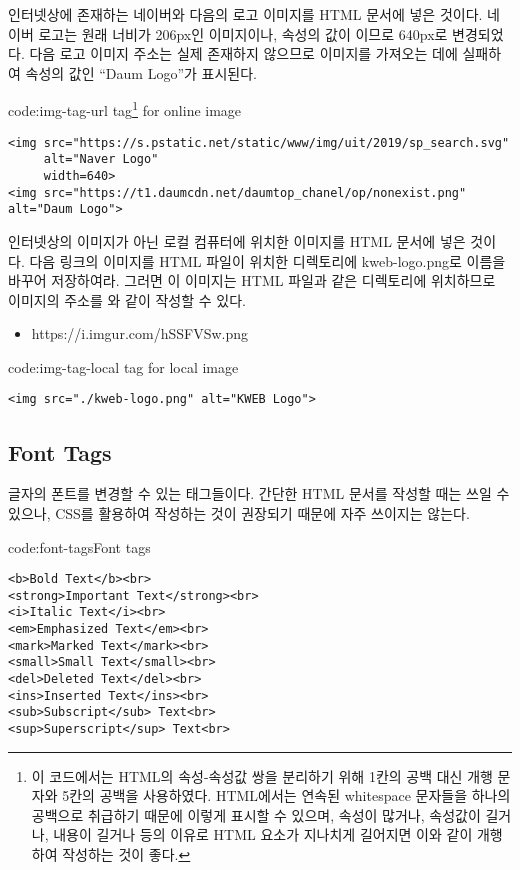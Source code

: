 \은 인터넷상에 존재하는 네이버와 다음의 로고 이미지를 HTML 문서에 넣은 것이다. 네이버 로고는 원래 너비가 206px인 이미지이나,  속성의 값이 이므로 640px로 변경되었다. 다음 로고 이미지 주소는 실제 존재하지 않으므로 이미지를 가져오는 데에 실패하여  속성의 값인 ``Daum Logo''가 표시된다.

\begin{codeenv}{code:img-tag-url}
    { tag\footnote{이 코드에서는 HTML의 속성-속성값 쌍을 분리하기 위해 1칸의 공백 대신 개행 문자와 5칸의 공백을 사용하였다. HTML에서는 연속된 whitespace 문자들을 하나의 공백으로 취급하기 때문에 이렇게 표시할 수 있으며, 속성이 많거나, 속성값이 길거나, 내용이 길거나 등의 이유로 HTML 요소가 지나치게 길어지면 이와 같이 개행하여 작성하는 것이 좋다.} for online image}
    \begin{verbatim}
<img src="https://s.pstatic.net/static/www/img/uit/2019/sp_search.svg"
     alt="Naver Logo"
     width=640>
<img src="https://t1.daumcdn.net/daumtop_chanel/op/nonexist.png" alt="Daum Logo">
\end{verbatim}
\end{codeenv}

\은 인터넷상의 이미지가 아닌 로컬 컴퓨터에 위치한 이미지를 HTML 문서에 넣은 것이다. 다음 링크의 이미지를 HTML 파일이 위치한 디렉토리에 kweb-logo.png로 이름을 바꾸어 저장하여라. 그러면 이 이미지는 HTML 파일과 같은 디렉토리에 위치하므로 이미지의 주소를 와 같이 작성할 수 있다.

\begin{itemize}
    \item https://i.imgur.com/hSSFVSw.png
\end{itemize}

\begin{codeenv}{code:img-tag-local}{ tag for local image}
\begin{verbatim}
<img src="./kweb-logo.png" alt="KWEB Logo">
\end{verbatim}
\end{codeenv}

\subsection*{Font Tags}
글자의 폰트를 변경할 수 있는 태그들이다. 간단한 HTML 문서를 작성할 때는 쓰일 수 있으나, CSS를 활용하여 작성하는 것이 권장되기 때문에 자주 쓰이지는 않는다.

\begin{codeenv}{code:font-tags}{Font tags}\begin{verbatim}
<b>Bold Text</b><br>
<strong>Important Text</strong><br>
<i>Italic Text</i><br>
<em>Emphasized Text</em><br>
<mark>Marked Text</mark><br>
<small>Small Text</small><br>
<del>Deleted Text</del><br>
<ins>Inserted Text</ins><br>
<sub>Subscript</sub> Text<br>
<sup>Superscript</sup> Text<br>
\end{verbatim}
\end{codeenv}

